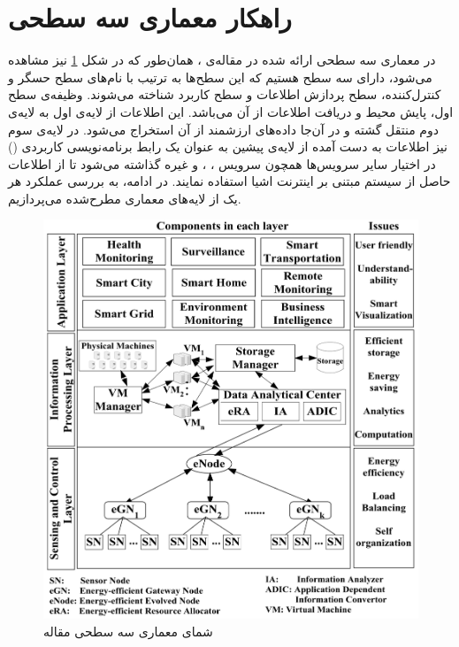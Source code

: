 \section{راهکار معماری سه سطحی}
در معماری سه سطحی ارائه شده در مقاله‌ی \cite{}، همان‌طور که در شکل \ref{fig:3l-arch} نیز مشاهده می‌شود، دارای سه سطح هستیم که این سطح‌ها به ترتیب با نام‌های سطح حسگر و کنترل‌کننده، سطح پردازش اطلاعات و سطح کاربرد شناخته می‌شوند. وظیفه‌ی سطح اول، پایش محیط و دریافت اطلاعات از آن می‌باشد. این اطلاعات از لایه‌ی اول به لایه‌ی دوم منتقل گشته و در آن‌جا داده‌های ارزشمند از آن استخراج می‌شود. در لایه‌ی سوم نیز اطلاعات به دست آمده از لایه‌ی پیشین به عنوان یک رابط برنامه‌نویسی کاربردی () در اختیار سایر سرویس‌ها همچون سرویس ،
،
و غیره گذاشته می‌شود تا از اطلاعات حاصل از سیستم مبتنی بر اینترنت اشیا استفاده نمایند. در ادامه، به بررسی عملکرد هر یک از لایه‌های معماری مطرح‌شده می‌پردازیم.

\begin{figure}
	\centering
	\includegraphics[width=\linewidth]{figs/3l-arch}
	\caption {شمای معماری سه سطحی مقاله \cite{}}
	\label{fig:3l-arch}
\end{figure}

